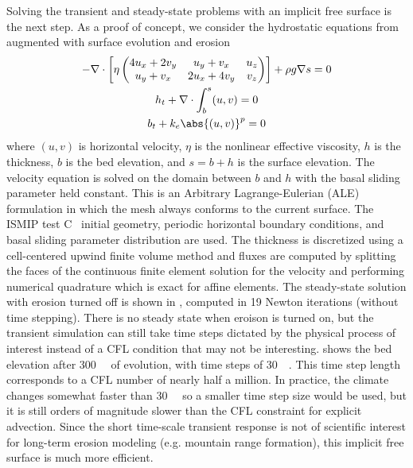 Solving the transient and steady-state problems with an implicit free surface is the next step.
As a proof of concept, we consider the hydrostatic equations from  augmented with surface evolution and erosion
\begin{gather}
  - \nabla\cdot \left[ \eta
    \begin{pmatrix}
      4 u_x + 2 v_y & u_y + v_x & u_z \\
      u_y + v_x & 2 u_x + 4 v_y & v_z
    \end{pmatrix} \right] + \rho g \nabla s = 0 \\
  h_t + \nabla\cdot \int_b^{s} (u,v) = 0  \\
  b_t + k_e \abs{(u,v)}^p = 0
\end{gather}
where $(u,v)$ is horizontal velocity, $\eta$ is the nonlinear effective viscosity, $h$ is the thickness, $b$ is the bed elevation, and $s = b+h$ is the surface elevation.
The velocity equation is solved on the domain between $b$ and $h$ with the basal sliding parameter held constant.
This is an Arbitrary Lagrange-Eulerian (ALE) formulation \citep{donea2004arbitrary} in which the mesh always conforms to the current surface.
The ISMIP test C~\cite{pattyn2008beh} initial geometry, periodic horizontal boundary conditions, and basal sliding parameter distribution are used.
The thickness is discretized using a cell-centered upwind finite volume method and fluxes are computed by splitting the faces of the continuous finite element solution for the velocity and performing numerical quadrature which is exact for affine elements.
The steady-state solution with erosion turned off is shown in , computed in 19 Newton iterations (without time stepping).
There is no steady state when eroison is turned on, but the transient simulation can still take time steps dictated by the physical process of interest instead of a CFL condition that may not be interesting.
 shows the bed elevation after \SI{300}{\kilo\year} of evolution, with time steps of \SI{30}{\kilo\year}.
This time step length corresponds to a CFL number of nearly half a million.
In practice, the climate changes somewhat faster than \SI{30}{\kilo\year} so a smaller time step size would be used, but it is still orders of magnitude slower than the CFL constraint for explicit advection.
Since the short time-scale transient response is not of scientific interest for long-term erosion modeling (e.g. mountain range formation), this implicit free surface is much more efficient.

